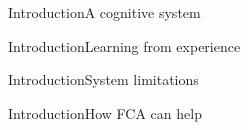 \begin{frame}{Introduction}{A cognitive system}
\end{frame}

\begin{frame}{Introduction}{Learning from experience}
\end{frame}

\begin{frame}{Introduction}{System limitations}
\end{frame}

\begin{frame}{Introduction}{How FCA can help}
\end{frame}